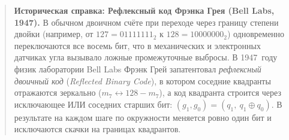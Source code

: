 \begin{quote}
\small\textbf{Историческая справка: Рефлексный код Фрэнка Грея (Bell Labs, 1947).}
В обычном двоичном счёте при переходе через границу степени двойки (например, от $127 = 01111111_2$ к $128 = 10000000_2$) одновременно переключаются все восемь бит, что в механических и электронных датчиках угла вызывало ложные промежуточные выбросы. В 1947~году физик лаборатории Bell Labs Фрэнк Грей запатентовал \emph{рефлексный двоичный код} (\emph{Reflected Binary Code}), в котором соседние квадранты отражаются зеркально ($m_7 \leftrightarrow 128 - m_7$), а код квадранта строится через исключающее ИЛИ соседних старших бит: $(g_1, g_0) = (q_1,\ q_1 \oplus q_0)$. В результате на каждом шаге по окружности меняется ровно один бит и исключаются скачки на границах квадрантов.
\end{quote}


